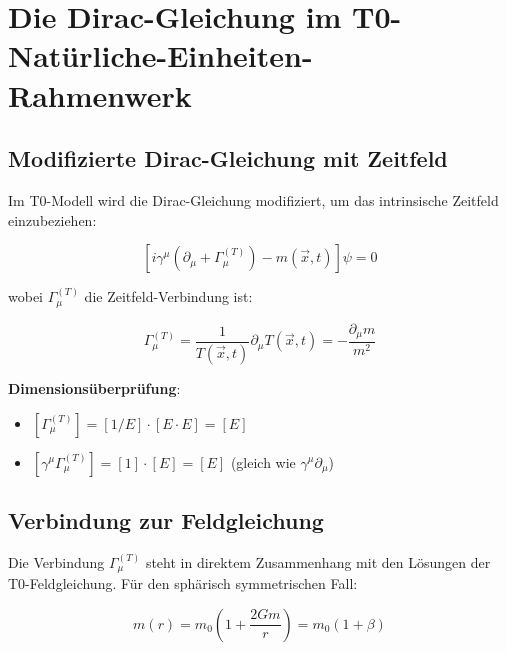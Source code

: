 \documentclass[12pt,a4paper]{article}
\newcommand{\Tfieldt}{T(\vec{x},t)}
\begin{document}
	\section{Die Dirac-Gleichung im  T0-Natürliche-Einheiten-\\Rahmenwerk}
	\label{sec:dirac_t0_rahmenwerk}
	
	\subsection{Modifizierte Dirac-Gleichung mit Zeitfeld}
	\label{subsec:modifizierte_dirac}
	
	Im T0-Modell wird die Dirac-Gleichung modifiziert, um das intrinsische Zeitfeld einzubeziehen:
	
	\begin{equation}
		\boxed{[i\gamma^{\mu}(\partial_{\mu} + \Gamma_{\mu}^{(T)}) - m(\vec{x},t)]\psi = 0}
		\label{eq:t0_dirac_gleichung}
	\end{equation}
	
	wobei $\Gamma_{\mu}^{(T)}$ die Zeitfeld-Verbindung ist:
	
	\begin{equation}
		\Gamma_{\mu}^{(T)} = \frac{1}{\Tfieldt} \partial_{\mu} \Tfieldt = -\frac{\partial_{\mu} m}{m^2}
		\label{eq:zeitfeld_verbindung}
	\end{equation}
	
	\textbf{Dimensionsüberprüfung}:
	\begin{itemize}
		\item $[\Gamma_{\mu}^{(T)}] = [1/E] \cdot [E \cdot E] = [E]$
		\item $[\gamma^{\mu} \Gamma_{\mu}^{(T)}] = [1] \cdot [E] = [E]$ (gleich wie $\gamma^{\mu} \partial_{\mu}$) \checkmark
	\end{itemize}
	
	\subsection{Verbindung zur Feldgleichung}
	\label{subsec:feld_verbindung}
	
	Die Verbindung $\Gamma_{\mu}^{(T)}$ steht in direktem Zusammenhang mit den Lösungen der T0-Feldgleichung. Für den sphärisch symmetrischen Fall:
	
	\begin{equation}
		m(r) = m_0\left(1 + \frac{2Gm}{r}\right) = m_0(1 + \beta)
		\label{eq:massenfeld_loesung}
	\end{equation}
	
\end{document}
